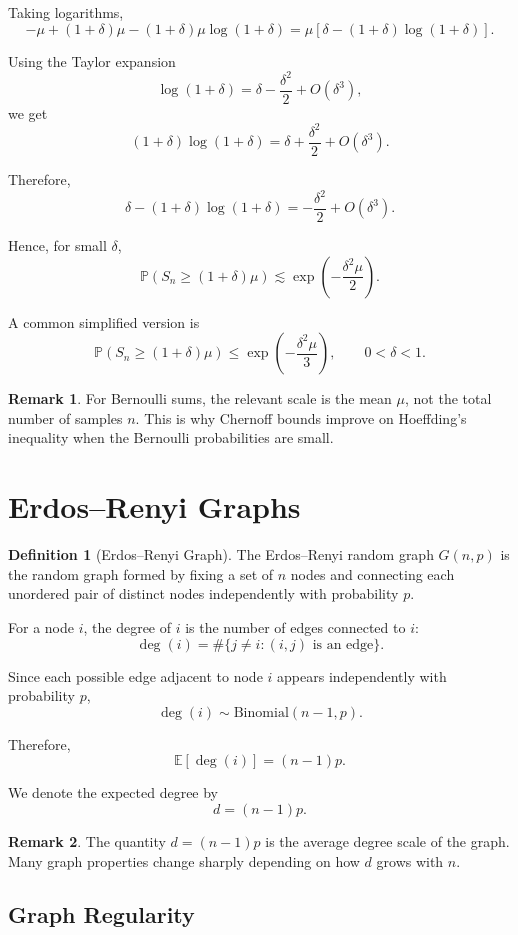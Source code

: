 \documentclass[12pt,oneside]{book}
\numberwithin{equation}{section}
\theoremstyle{definition}
\newtheorem{definition}{Definition}[section]
\newtheorem{remark}{Remark}[section]
\theoremstyle{plain}
\theoremstyle{remark}
\newcommand{\E}{\mathbb{E}}
\newcommand{\Prob}{\mathbb{P}}
\newcommand{\Bin}{\mathrm{Binomial}}
\begin{document}
Taking logarithms,
\[
-\mu
+
(1+\delta)\mu
-
(1+\delta)\mu\log(1+\delta)
=
\mu\left[
\delta-(1+\delta)\log(1+\delta)
\right].
\]

Using the Taylor expansion
\[
\log(1+\delta)
=
\delta-\frac{\delta^2}{2}
+
O(\delta^3),
\]
we get
\[
(1+\delta)\log(1+\delta)
=
\delta+\frac{\delta^2}{2}
+
O(\delta^3).
\]

Therefore,
\[
\delta-(1+\delta)\log(1+\delta)
=
-\frac{\delta^2}{2}
+
O(\delta^3).
\]

Hence, for small $\delta$,
\[
\Prob(S_n\geq (1+\delta)\mu)
\lesssim
\exp\left(
-\frac{\delta^2\mu}{2}
\right).
\]

A common simplified version is
\[
\Prob(S_n\geq (1+\delta)\mu)
\leq
\exp\left(
-\frac{\delta^2\mu}{3}
\right),
\qquad
0<\delta<1.
\]

\begin{remark}
For Bernoulli sums, the relevant scale is the mean $\mu$, not the total number of samples $n$. This is why Chernoff bounds improve on Hoeffding's inequality when the Bernoulli probabilities are small.
\end{remark}

\section{Erdos--Renyi Graphs}

\begin{definition}[Erdos--Renyi Graph]
The Erdos--Renyi random graph $G(n,p)$ is the random graph formed by fixing a set of $n$ nodes and connecting each unordered pair of distinct nodes independently with probability $p$.
\end{definition}

For a node $i$, the degree of $i$ is the number of edges connected to $i$:
\[
\deg(i)
=
\#\{j\neq i : (i,j)\text{ is an edge}\}.
\]

Since each possible edge adjacent to node $i$ appears independently with probability $p$,
\[
\deg(i)
\sim
\Bin(n-1,p).
\]

Therefore,
\[
\E[\deg(i)]
=
(n-1)p.
\]

We denote the expected degree by
\[
d=(n-1)p.
\]

\begin{remark}
The quantity $d=(n-1)p$ is the average degree scale of the graph. Many graph properties change sharply depending on how $d$ grows with $n$.
\end{remark}

\subsection{Graph Regularity}
\end{document}

